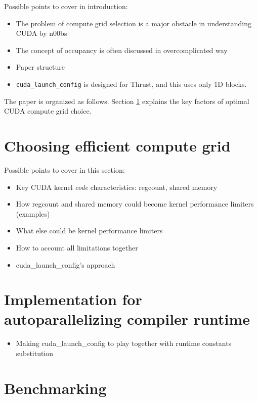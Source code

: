 \documentclass{usiinftr}
\begin{document}
Possible points to cover in introduction:

\begin{itemize}
\item The problem of compute grid selection is a major obstacle in understanding CUDA by n00bs
\item The concept of occupancy is often discussed in overcomplicated way
\item Paper structure
\item \texttt{cuda\_launch\_config} is designed for Thrust, and this uses only 1D blocks.
\end{itemize}

The paper is organized as follows. Section \ref{sec:compute_grid} explains the key factors of optimal CUDA compute grid choice.

\section{Choosing efficient compute grid}
\label{sec:compute_grid}

Possible points to cover in this section:

\begin{itemize}
\item Key CUDA kernel \emph{code} characteristics: regcount, shared memory
\item How regcount and shared memory could become kernel performance limiters (examples)
\item What else could be kernel performance limiters
\item How to account all limitations together
\item cuda\_launch\_config's approach
\end{itemize}


\section{Implementation for autoparallelizing compiler runtime}

\begin{itemize}
\item Making cuda\_launch\_config to play together with runtime constants substitution
\end{itemize}

\section{Benchmarking}
\end{document}
